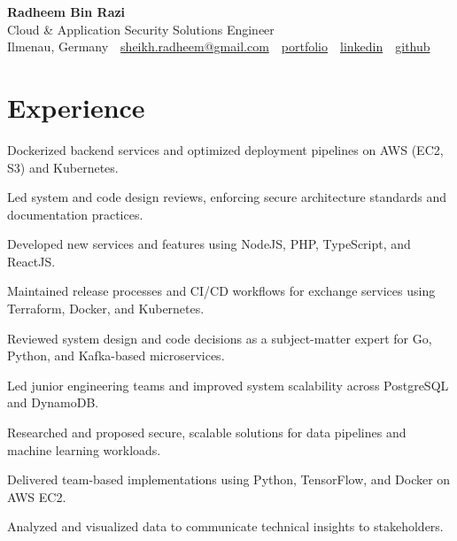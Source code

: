 \documentclass[11pt,a4paper]{resume}
\makeatletter
\newcommand{\Portfolio}{https://radheem.github.io/my-cv}
\newcommand{\PortfolioText}{portfolio}
\newcommand{\GitHub}{https://github.com/radheem}
\newcommand{\LinkedIn}{https://www.linkedin.com/in/radheem-razi}
\newcommand{\Email}{sheikh.radheem@gmail.com}
\makeatother
\begin{document}
\begin{center}
  {\huge\bfseries Radheem Bin Razi}\\[3pt]
  {\large Cloud \& Application Security Solutions Engineer}\\[6pt]
  \small
  Ilmenau, Germany \,\textbar\,
  \href{mailto:\Email}{\Email} \,\textbar\,
  \href{\Portfolio}{\PortfolioText} \,\textbar\,
  \href{\LinkedIn}{linkedin} \,\textbar\,
  \href{\GitHub}{github}
\end{center}
\vspace{2pt}

\section{Experience}

\bullets
  \item Dockerized backend services and optimized deployment pipelines on AWS (EC2, S3) and Kubernetes.
  \item Led system and code design reviews, enforcing secure architecture standards and documentation practices.
  \item Developed new services and features using NodeJS, PHP, TypeScript, and ReactJS.
\bulletsend
\vspace{3pt}
\bullets
  \item Maintained release processes and CI/CD workflows for exchange services using Terraform, Docker, and Kubernetes.
  \item Reviewed system design and code decisions as a subject-matter expert for Go, Python, and Kafka-based microservices.
  \item Led junior engineering teams and improved system scalability across PostgreSQL and DynamoDB.
\bulletsend
\vspace{3pt}
\bullets
  \item Researched and proposed secure, scalable solutions for data pipelines and machine learning workloads.
  \item Delivered team-based implementations using Python, TensorFlow, and Docker on AWS EC2.
  \item Analyzed and visualized data to communicate technical insights to stakeholders.
\bulletsend
\vspace{3pt}
\end{document}
